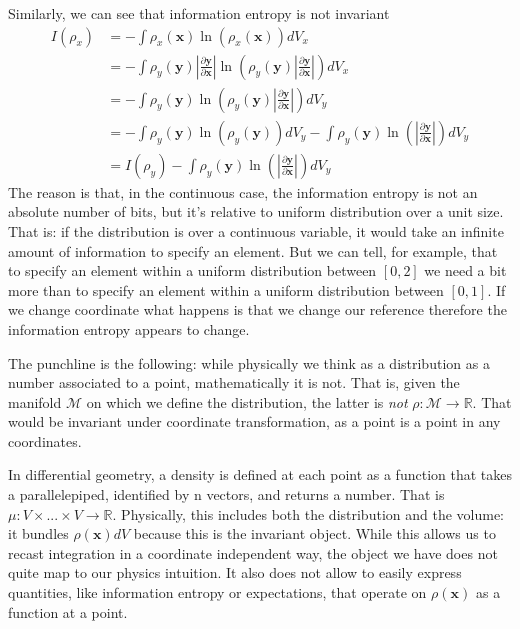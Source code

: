 \documentclass[smallextended]{svjour3}
\numberwithin{equation}{section}
\theoremstyle{definition}
\begin{document}
Similarly, we can see that information entropy is not invariant
\begin{align*}
I(\rho_x) &=-\int \rho_x(\mathbf{x}) \ln (\rho_x(\mathbf{x})) dV_x \\
&=-\int \rho_y(\mathbf{y}) \left|\frac{\partial \mathbf{y}}{\partial \mathbf{x}}\right| \ln (\rho_y(\mathbf{y}) \left|\frac{\partial \mathbf{y}}{\partial \mathbf{x}}\right|) dV_x \\
&=-\int \rho_y(\mathbf{y}) \ln (\rho_y(\mathbf{y}) \left|\frac{\partial \mathbf{y}}{\partial \mathbf{x}}\right|) dV_y \\
&=-\int \rho_y(\mathbf{y}) \ln (\rho_y(\mathbf{y})) dV_y - \int \rho_y(\mathbf{y}) \ln (\left|\frac{\partial \mathbf{y}}{\partial \mathbf{x}}\right|) dV_y \\&=I(\rho_y) - \int \rho_y(\mathbf{y}) \ln (\left|\frac{\partial \mathbf{y}}{\partial \mathbf{x}}\right|) dV_y
\end{align*}
The reason is that, in the continuous case, the information entropy is not an absolute number of bits, but it's relative to uniform distribution over a unit size. That is: if the distribution is over a continuous variable, it would take an infinite amount of information to specify an element. But we can tell, for example, that to specify an element within a uniform distribution between $[0,2]$ we need a bit more than to specify an element within a uniform distribution between $[0,1]$. If we change coordinate what happens is that we change our reference therefore the information entropy appears to change.

The punchline is the following: while physically we think as a distribution as a number associated to a point, mathematically it is not. That is, given the manifold $\mathcal{M}$ on which we define the distribution, the latter is \emph{not} $\rho : \mathcal{M} \rightarrow \mathbb{R}$. That would be invariant under coordinate transformation, as a point is a point in any coordinates.

In differential geometry, a density is defined at each point as a function that takes a parallelepiped, identified by n vectors, and returns a number. That is $\mu : V \times ... \times V \rightarrow \mathbb{R}$. Physically, this includes both the distribution and the volume: it bundles $\rho(\mathbf{x}) dV$ because this is the invariant object. While this allows us to recast integration in a coordinate independent way, the object we have does not quite map to our physics intuition. It also does not allow to easily express quantities, like information entropy or expectations, that operate on $\rho(\mathbf{x})$ as a function at a point.
\end{document}
